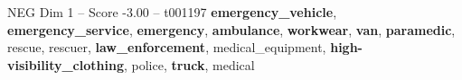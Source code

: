 \begin{textsample}{NEG Dim 1 – Score -3.00 – t001197}  \label{ex:f1_neg_034}
\textbf{emergency\_vehicle}, \textbf{emergency\_service}, \textbf{emergency}, \textbf{ambulance}, \textbf{workwear}, \textbf{van}, \textbf{paramedic}, rescue, rescuer, \textbf{law\_enforcement}, medical\_equipment, \textbf{high-visibility\_clothing}, police, \textbf{truck}, medical

\end{textsample}
